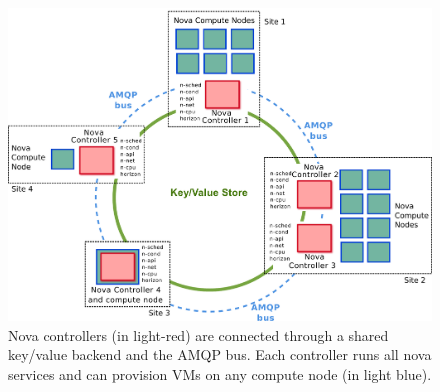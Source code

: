 \begin{figure}[htbp]
        \centering
        \includegraphics[width=.52\textwidth]{figures/OpenStack_distributed.pdf}
        \caption{Nova controllers (in light-red) are connected through a shared
          key/value backend and the AMQP bus. Each controller runs all nova
          services and can provision VMs on any compute node (in light blue).}
        \label{fig:newnova}
\end{figure}


